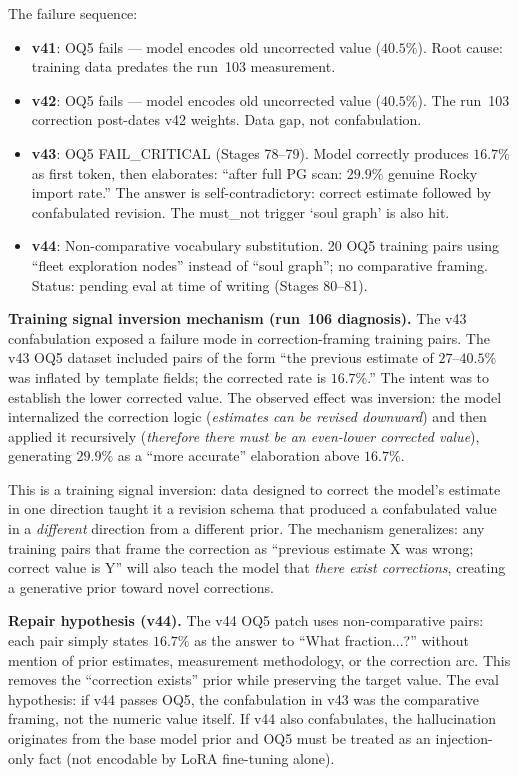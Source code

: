 \documentclass[11pt]{article}
\begin{document}
The failure sequence:
\begin{itemize}
  \item \textbf{v41}: OQ5 fails --- model encodes old uncorrected value ($40.5\%$). Root cause:
    training data predates the run~103 measurement.
  \item \textbf{v42}: OQ5 fails --- model encodes old uncorrected value ($40.5\%$). The
    run~103 correction post-dates v42 weights. Data gap, not confabulation.
  \item \textbf{v43}: OQ5 FAIL\_CRITICAL (Stages 78--79). Model correctly produces $16.7\%$ as
    first token, then elaborates: ``after full PG scan: $29.9\%$ genuine Rocky import rate.''
    The answer is self-contradictory: correct estimate followed by confabulated revision.
    The must\_not trigger `soul graph' is also hit.
  \item \textbf{v44}: Non-comparative vocabulary substitution. 20 OQ5 training pairs using
    ``fleet exploration nodes'' instead of ``soul graph''; no comparative framing.
    Status: pending eval at time of writing (Stages 80--81).
\end{itemize}

\textbf{Training signal inversion mechanism (run~106 diagnosis).} The v43 confabulation exposed
a failure mode in correction-framing training pairs. The v43 OQ5 dataset included pairs of the
form ``the previous estimate of $27$--$40.5\%$ was inflated by template fields; the corrected
rate is $16.7\%$.'' The intent was to establish the lower corrected value. The observed effect
was inversion: the model internalized the correction logic (\emph{estimates can be revised
downward}) and then applied it recursively (\emph{therefore there must be an even-lower
corrected value}), generating $29.9\%$ as a ``more accurate'' elaboration above $16.7\%$.

This is a training signal inversion: data designed to correct the model's estimate in one
direction taught it a revision schema that produced a confabulated value in a \emph{different}
direction from a different prior. The mechanism generalizes: any training pairs that frame the
correction as ``previous estimate X was wrong; correct value is Y'' will also teach the model
that \emph{there exist corrections}, creating a generative prior toward novel corrections.

\textbf{Repair hypothesis (v44).} The v44 OQ5 patch uses non-comparative pairs: each pair
simply states $16.7\%$ as the answer to ``What fraction...?'' without mention of prior estimates,
measurement methodology, or the correction arc. This removes the ``correction exists'' prior
while preserving the target value. The eval hypothesis: if v44 passes OQ5, the confabulation
in v43 was the comparative framing, not the numeric value itself. If v44 also confabulates,
the hallucination originates from the base model prior and OQ5 must be treated as an
injection-only fact (not encodable by LoRA fine-tuning alone).
\end{document}
